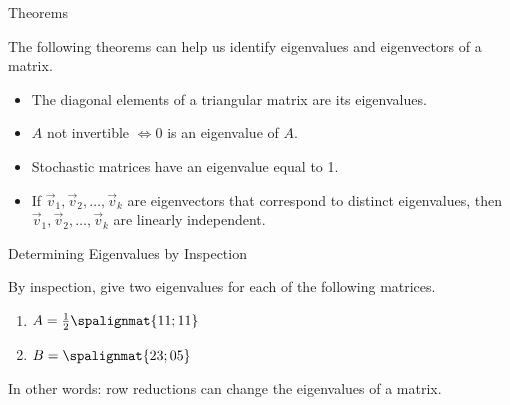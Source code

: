 \begin{frame}{Theorems}

    The following theorems can help us identify eigenvalues and eigenvectors of a matrix. 
    
    \vspace{12pt}
    
    \begin{itemize}
        \item<2-> The diagonal elements of a triangular matrix are its eigenvalues. \vspace{0.25cm}
        \item<3-> $A$ not invertible $\Leftrightarrow 0$ is an eigenvalue of $A$. \vspace{0.5cm}
        \item<4-> Stochastic matrices have an eigenvalue equal to 1.\vspace{0.5cm}
        \item<5-> If $\vec v_1, \vec v_2, \ldots , \vec v_k$ are eigenvectors that correspond to distinct eigenvalues, then $\vec v_1, \vec v_2, \ldots , \vec v_k$ are linearly independent.
    \end{itemize}
    
    
\end{frame}




\begin{frame}{Determining Eigenvalues by Inspection} 

    By inspection, give two eigenvalues for each of the following matrices.
    \begin{enumerate}
        \item $A=\frac 12 \spalignmat{1 1;1 1}$
        \item $B=\spalignmat{2 3;0 5}$
    \end{enumerate}


\end{frame}




\begin{frame}{} 

	\vspace{-12pt}
    \begin{center}\end{center}
    
    In other words: row reductions can change the eigenvalues of a matrix. 
    
\end{frame}




